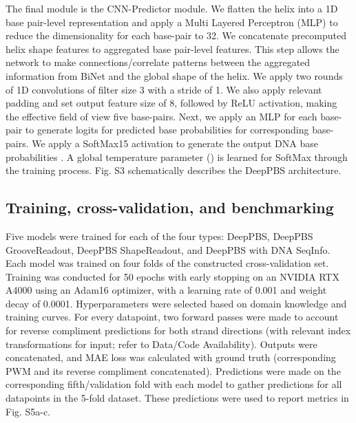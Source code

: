 The final module is the CNN-Predictor module. We flatten the helix into a 1D base pair-level representation and apply a Multi Layered Perceptron (MLP) to reduce the dimensionality for each base-pair to 32. We concatenate precomputed helix shape features to aggregated base pair-level features. This step allows the network to make connections/correlate patterns between the aggregated information from BiNet and the global shape of the helix. We apply two rounds of 1D convolutions of filter size 3 with a stride of 1. We also apply relevant padding and set output feature size of 8, followed by ReLU activation, making the effective field of view five base-pairs. Next, we apply an MLP for each base-pair to generate logits for predicted base probabilities  for corresponding base-pairs. We apply a SoftMax15 activation to generate the output DNA base probabilities . A global temperature parameter () is learned for SoftMax through the training process. Fig. S3 schematically describes the DeepPBS architecture.

% 
\subsection{Training, cross-validation, and benchmarking}

Five models were trained for each of the four types: DeepPBS, DeepPBS GrooveReadout, DeepPBS ShapeReadout, and DeepPBS with DNA SeqInfo. Each model was trained on four folds of the constructed cross-validation set. Training was conducted for 50 epochs with early stopping on an NVIDIA RTX A4000 using an Adam16 optimizer, with a learning rate of 0.001 and weight decay of 0.0001. Hyperparameters were selected based on domain knowledge and training curves. For every datapoint, two forward passes were made to account for reverse compliment predictions for both strand directions (with relevant index transformations for input; refer to Data/Code Availability). Outputs were concatenated, and MAE loss was calculated with ground truth (corresponding PWM and its reverse compliment concatenated). Predictions were made on the corresponding fifth/validation fold with each model to gather predictions for all datapoints in the 5-fold dataset. These predictions were used to report metrics in Fig. S5a-c. 

